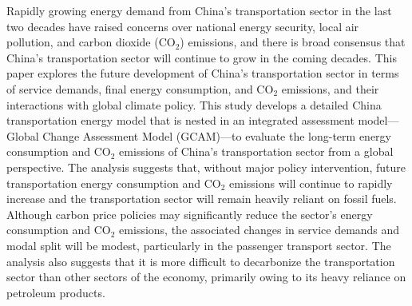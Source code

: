 Rapidly growing energy demand from China's transportation sector in the last two decades have raised concerns over national energy security, local air pollution, and carbon dioxide (CO$_2$) emissions, and there is broad consensus that China's transportation sector will continue to grow in the coming decades. This paper explores the future development of China's transportation sector in terms of service demands, final energy consumption, and CO$_2$ emissions, and their interactions with global climate policy. This study develops a detailed China transportation energy model that is nested in an integrated assessment model—Global Change Assessment Model (GCAM)—to evaluate the long-term energy consumption and CO$_2$ emissions of China's transportation sector from a global perspective. The analysis suggests that, without major policy intervention, future transportation energy consumption and CO$_2$ emissions will continue to rapidly increase and the transportation sector will remain heavily reliant on fossil fuels. Although carbon price policies may significantly reduce the sector's energy consumption and CO$_2$ emissions, the associated changes in service demands and modal split will be modest, particularly in the passenger transport sector. The analysis also suggests that it is more difficult to decarbonize the transportation sector than other sectors of the economy, primarily owing to its heavy reliance on petroleum products.
